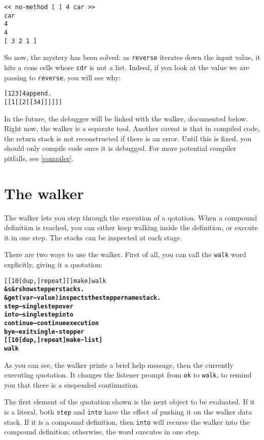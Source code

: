 \documentclass{book}
\begin{document}
\begin{verbatim}
<< no-method [ ] 4 car >>
car
4
4
[ 3 2 1 ]
\end{verbatim}

So now, the mystery has been solved: as \texttt{reverse} iterates down the input value, it hits a cons cells whose \texttt{cdr} is not a list. Indeed, if you look at the value we are passing to \texttt{reverse}, you will see why:

\begin{alltt}
  [ 1 2 3 ] 4 append .
[[ 1 [[ 2 [[ 3 4 ]] ]] ]]
\end{alltt}

In the future, the debugger will be linked with the walker, documented below. Right now, the walker is a separate tool. Another caveat is that in compiled code, the return stack is not reconstructed if there is an error. Until this is fixed, you should only compile code once it is debugged. For more potential compiler pitfalls, see \ref{compiler}.

\section{The walker}

The walker lets you step through the execution of a qotation. When a compound definition is reached, you can either keep walking inside the definition, or execute it in one step. The stacks can be inspected at each stage.

There are two ways to use the walker. First of all, you can call the \texttt{walk} word explicitly, giving it a quotation:

\begin{alltt}
  [ [ 10 [ dup , ] repeat ] [ ] make ] walk
\textbf{\&s \&r show stepper stacks.
\&get ( var -- value ) inspects the stepper namestack.
step -- single step over
into -- single step into
continue -- continue execution
bye -- exit single-stepper
[ [ 10 [ dup , ] repeat ] make-list ]
walk}
\end{alltt}

As you can see, the walker prints a brief help message, then the currently executing quotation. It changes the listener prompt from \texttt{ok} to \texttt{walk}, to remind you that there is a suspended continuation.

The first element of the quotation shown is the next object to be evaluated. If it is a literal, both \texttt{step} and \texttt{into} have the effect of pushing it on the walker data stack. If it is a compound definition, then \texttt{into} will recurse the walker into the compound definition; otherwise, the word executes in one step.
\end{document}
